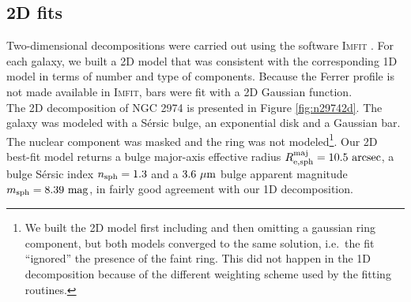 \documentclass[preprint2]{emulateapj}
\begin{document}
%
%

\subsection{2D fits}
\label{sec:2d}
Two-dimensional decompositions were carried out using the software \textsc{Imfit} \citep{imfit}.
For each galaxy, we built a 2D model that was consistent with the corresponding 1D model in terms of number and type of components. 
Because the Ferrer profile is not made available in \textsc{Imfit},
bars were fit with a 2D Gaussian function. \\
The 2D decomposition of NGC 2974 is presented in Figure \ref{fig:n29742d}. 
The galaxy was modeled with a S\'ersic bulge, an exponential disk and a Gaussian bar.
The nuclear component was masked and the ring was not 
modeled\footnote{We built the 2D model first including and then omitting a gaussian ring component, 
but both models converged to the same solution, i.e.~the fit ``ignored'' the presence of the faint ring. 
This did not happen in the 1D decomposition because of the different weighting scheme used by the fitting routines.}. 
Our 2D best-fit model returns a bulge major-axis effective radius $R_{\rm e,sph}^{\rm maj} = 10.5~\rm arcsec$, 
a bulge S\'ersic index $n_{\rm sph} = 1.3$ and a $3.6~\rm \mu m$ bulge apparent magnitude $m_{\rm sph} = 8.39~\rm mag$, 
in fairly good agreement with our 1D decomposition. 
\end{document}

